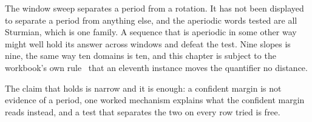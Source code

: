 The window sweep separates a period from a rotation. It has not been displayed to separate a period from
anything else, and the aperiodic words tested are all Sturmian, which is one family. A sequence that
is aperiodic in some other way might well hold its answer across windows and defeat the test. Nine
slopes is nine, the same way ten domains is ten, and this chapter is subject to the workbook's own
rule~\cite{src:Quigg-orior-workbook} that an eleventh instance moves the quantifier no distance.

The claim that holds is narrow and it is enough: a confident margin is not evidence of a period, one
worked mechanism explains what the confident margin reads instead, and a test that separates
the two on every row tried is free.
